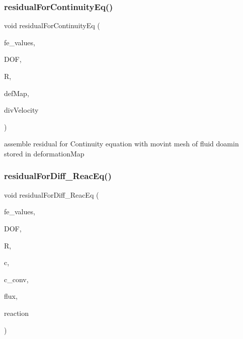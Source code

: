 \subsubsection{\texorpdfstring{residualForContinuityEq()}{residualForContinuityEq()}\hspace{0.1cm}{\footnotesize\ttfamily [2/2]}}
{\footnotesize\ttfamily void residual\+For\+Continuity\+Eq (\begin{DoxyParamCaption}\item[{const F\+E\+Values$<$ dim $>$ \&}]{fe\+\_\+values,  }\item[{unsigned int}]{D\+OF,  }\item[{Table$<$ 1, T $>$ \&}]{R,  }\item[{\mbox{\hyperlink{structdeformation_map}{deformation\+Map}}$<$ T, dim $>$ \&}]{def\+Map,  }\item[{Table$<$ 1, T $>$ \&}]{div\+Velocity }\end{DoxyParamCaption})}

assemble residual for Continuity equation with movint mesh of fluid doamin stored in deformation\+Map \mbox{\label{class_residual_a144663fb81fc60d4db0c5a8e45176e61}} 
\subsubsection{\texorpdfstring{residualForDiff\_ReacEq()}{residualForDiff\_ReacEq()}\hspace{0.1cm}{\footnotesize\ttfamily [1/2]}}
{\footnotesize\ttfamily void residual\+For\+Diff\+\_\+\+Reac\+Eq (\begin{DoxyParamCaption}\item[{const F\+E\+Values$<$ dim $>$ \&}]{fe\+\_\+values,  }\item[{unsigned int}]{D\+OF,  }\item[{dealii\+::\+Table$<$ 1, T $>$ \&}]{R,  }\item[{dealii\+::\+Table$<$ 1, T $>$ \&}]{c,  }\item[{dealii\+::\+Table$<$ 1, double $>$ \&}]{c\+\_\+conv,  }\item[{dealii\+::\+Table$<$ 2, T $>$ \&}]{flux,  }\item[{dealii\+::\+Table$<$ 1, T $>$ \&}]{reaction }\end{DoxyParamCaption})}

